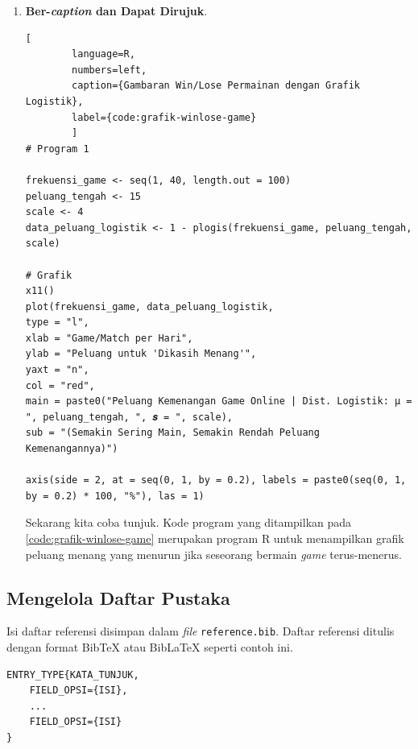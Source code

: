 \begin{enumerate}[]
\begin{lstlisting}[language=R, numbers=left]
# Grafik
x11()
plot(frekuensi_game, data_peluang_logistik,
type = "l",
xlab = "Game/Match per Hari",
ylab = "Peluang untuk 'Dikasih Menang'",
yaxt = "n",
col = "red",
main = paste0("Peluang Kemenangan Game Online | Dist. Logistik: μ = ", peluang_tengah, ", 𝒔 = ", scale),
sub = "(Semakin Sering Main, Semakin Rendah Peluang Kemenangannya)")

axis(side = 2, at = seq(0, 1, by = 0.2), labels = paste0(seq(0, 1, by = 0.2) * 100, "%"), las = 1)
    \end{lstlisting}
    
    \item \textbf{Ber-\textit{caption} dan Dapat Dirujuk}. 
    
    \begin{lstlisting}[
        language=R, 
        numbers=left,
        caption={Gambaran Win/Lose Permainan dengan Grafik Logistik},
        label={code:grafik-winlose-game}
        ]
# Program 1

frekuensi_game <- seq(1, 40, length.out = 100)
peluang_tengah <- 15
scale <- 4
data_peluang_logistik <- 1 - plogis(frekuensi_game, peluang_tengah, scale)

# Grafik
x11()
plot(frekuensi_game, data_peluang_logistik,
type = "l",
xlab = "Game/Match per Hari",
ylab = "Peluang untuk 'Dikasih Menang'",
yaxt = "n",
col = "red",
main = paste0("Peluang Kemenangan Game Online | Dist. Logistik: μ = ", peluang_tengah, ", 𝒔 = ", scale),
sub = "(Semakin Sering Main, Semakin Rendah Peluang Kemenangannya)")

axis(side = 2, at = seq(0, 1, by = 0.2), labels = paste0(seq(0, 1, by = 0.2) * 100, "%"), las = 1)
    \end{lstlisting}
    
    Sekarang kita coba tunjuk. Kode program yang ditampilkan pada \autoref{code:grafik-winlose-game} merupakan program R untuk menampilkan grafik peluang menang yang menurun jika seseorang bermain \textit{game} terus-menerus.
\end{enumerate}

\subsection{Mengelola Daftar Pustaka}

Isi daftar referensi disimpan dalam \textit{file} \texttt{reference.bib}. Daftar referensi ditulis dengan format BibTeX atau BibLaTeX seperti contoh ini.

\begin{lstlisting}
ENTRY_TYPE{KATA_TUNJUK,
    FIELD_OPSI={ISI},
    ...
    FIELD_OPSI={ISI}
}
\end{lstlisting}

